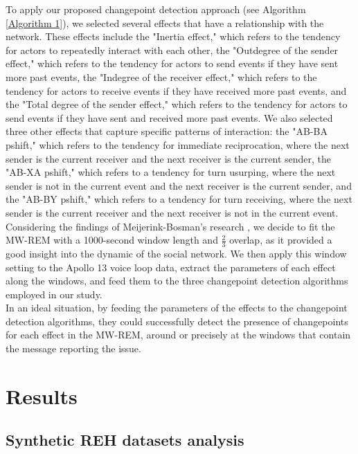 \documentclass[]{interact}
\theoremstyle{plain}%
\theoremstyle{definition}
\theoremstyle{remark}
\begin{document}
{	To apply our proposed changepoint detection approach (see Algorithm \autoref{Algorithm 1}), we selected several effects that have a relationship with the network. These effects include the "Inertia effect," which refers to the tendency for actors to repeatedly interact with each other, the "Outdegree of the sender effect," which refers to the tendency for actors to send events if they have sent more past events, the "Indegree of the receiver effect," which refers to the tendency for actors to receive events if they have received more past events, and the "Total degree of the sender effect," which refers to the tendency for actors to send events if they have sent and received more past events. We also selected three other effects that capture specific patterns of interaction: the "AB-BA pshift," which refers to the tendency for immediate reciprocation, where the next sender is the current receiver and the next receiver is the current sender, the "AB-XA pshift," which refers to a tendency for turn usurping, where the next sender is not in the current event and the next receiver is the current sender, and the "AB-BY pshift," which refers to a tendency for turn receiving, where the next sender is the current receiver and the next receiver is not in the current event. \\
	
	Considering the findings of Meijerink-Bosman's research \cite{meijerink-bosmanDynamicRelationalEvent2022}, we decide to fit the MW-REM with a 1000-second window length and $\frac{2}{3}$ overlap, as it provided a good insight into the dynamic of the social network. We then apply this window setting to the Apollo 13 voice loop data, extract the parameters of each effect along the windows, and feed them to the three changepoint detection algorithms employed in our study. \\
	
	In an ideal situation, by feeding the parameters of the effects to the changepoint detection algorithms, they could successfully detect the presence of changepoints for each effect in the MW-REM, around or precisely at the windows that contain the message reporting the issue.
	
	\section{\fontsize{14}{15}\selectfont Results}
	
	\subsection{Synthetic REH datasets analysis}
	
}
\end{document}
